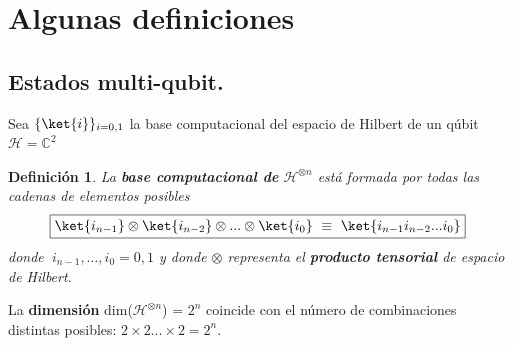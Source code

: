\documentclass[a4paper,11pt]{book} %
\newtheorem{definicion_contador}{Definición}
\newcommand{\Definicion}[1]{
		\begin{mybox_gray2}{}
			\begin{definicion_contador}
				 #1 
			\end{definicion_contador} 
		\end{mybox_gray2}
	}
\numberwithin{equation}{chapter}
\begin{document}
    \section{Algunas definiciones}
    
		\subsection{Estados multi-qubit.}

 Sea $\{ \ket{i}\}_{i=0,1}$ la base computacional del espacio de Hilbert de un qúbit $\mathcal{H} = {\mathbb C}^2$
 
	\Definicion{
	La \textbf{base computacional de} $ \mathcal{H}^{\otimes n}$ está formada por todas las cadenas de elementos posibles
	$$
	\boxed{\ket{i_{n-1}}\otimes \ket{i_{n-2}}\otimes ... \otimes \ket{i_0} ~\equiv ~\ket{i_{n-1} i_{n-2}...i_0}}~
	$$ 
	donde $~ i_{n-1},\dots,i_0=0,1$ y donde $\otimes$ representa el \textbf{producto tensorial} de espacio de Hilbert.
	}
	
La \textbf{dimensión}  dim($\mathcal{H}^{\otimes n}$) = $2^n$ coincide con el número de combinaciones distintas posibles: 	$2\times 2...\times 2 = 2^n$.    
\end{document}
